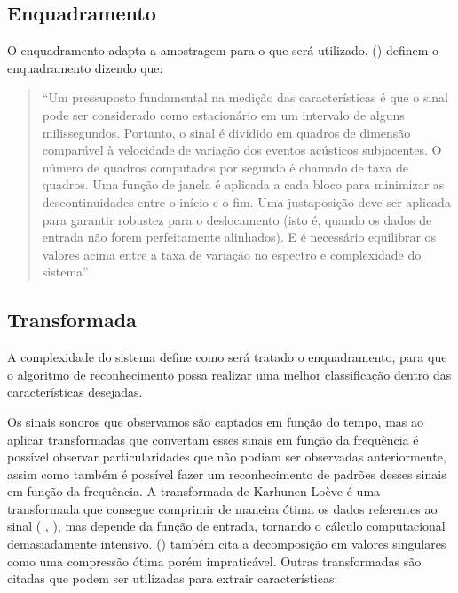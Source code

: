 \subsection{Enquadramento}
\label{ss.enquadramento}

O enquadramento adapta a amostragem para o que será utilizado.  (\citeyear{canoetal05}) definem o enquadramento dizendo que:

\begin{quotation}
``Um pressuposto fundamental na medição das características é que o sinal pode ser considerado como estacionário em um intervalo de alguns milissegundos. Portanto, o sinal é dividido em quadros de dimensão comparável à velocidade de variação dos eventos acústicos subjacentes. O número de quadros computados por segundo é chamado de taxa de quadros. Uma função de janela é aplicada a cada bloco para minimizar as descontinuidades entre o início e o fim. Uma justaposição deve ser aplicada para garantir robustez para o deslocamento (isto é, quando os dados de entrada não forem perfeitamente alinhados). E é necessário equilibrar os valores acima entre a taxa de variação no espectro e complexidade do sistema''
\end{quotation}

\subsection{Transformada}
\label{ss.transformada}

A complexidade do sistema define como será tratado o enquadramento, para que o algoritmo de reconhecimento possa realizar uma melhor classificação dentro das características desejadas.

Os sinais sonoros que observamos são captados em função do tempo, mas ao aplicar transformadas que convertam esses sinais em função da frequência é possível observar particularidades que não podiam ser observadas anteriormente, assim como também é possível fazer um reconhecimento de padrões desses sinais em função da frequência. A transformada de Karhunen-Loève é uma transformada que consegue comprimir de maneira ótima os dados referentes ao sinal  ( , \citeyear{raok}), mas depende da função de entrada, tornando o cálculo computacional demasiadamente intensivo.  (\citeyear{canoetal05}) também cita a decomposição em valores singulares como uma compressão ótima porém impraticável. Outras transformadas são citadas que podem ser utilizadas para extrair características:

